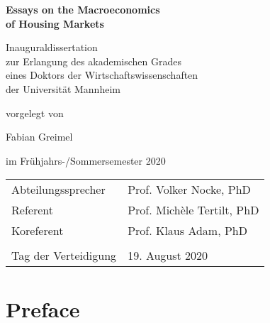 \documentclass[12pt,a4paper]{book}
\begin{document}
\begin{titlepage}
\centering

\vspace*{5cm}

{\bfseries \Huge Essays on the Macroeconomics \\ \bigskip  of Housing Markets}

\vfill

Inauguraldissertation \\
zur Erlangung des akademischen Grades \\
eines Doktors der Wirtschaftswissenschaften \\
der Universität Mannheim

\vfill

vorgelegt von \\ \vspace{10pt}%

{\Large Fabian Greimel} \\ \vspace{10pt}%

im Frühjahrs-/Sommersemester 2020

\end{titlepage}

\thispagestyle{empty}

  \vspace*{18cm}
  
\begin{tabular}{ll}
  Abteilungssprecher & Prof. Volker Nocke, PhD \\
  Referent & Prof. Michèle Tertilt, PhD \\
  Koreferent & Prof. Klaus Adam, PhD \\
  \\
  Tag der Verteidigung & 19. August 2020
\end{tabular}




\setcounter{tocdepth}{1}

\tableofcontents



\chapter*{Preface}


\end{document}

